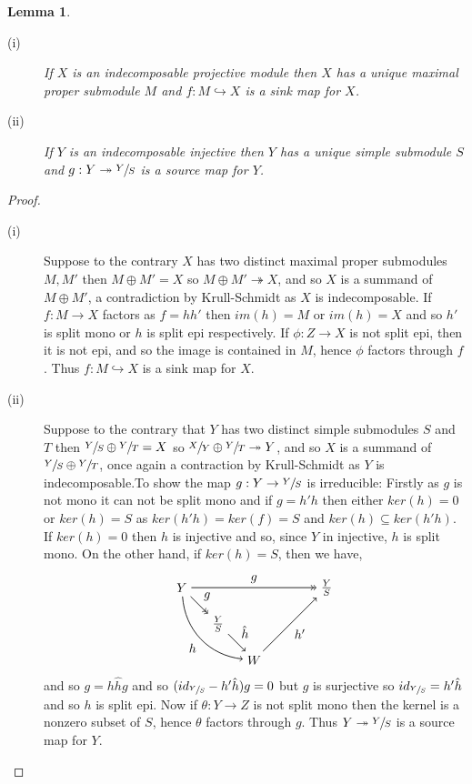 \documentclass[11.5pt, twoside, a4paper, titlepage]{report}
\theoremstyle{definition}
\theoremstyle{plain}
\newtheorem{lem}[mydef]{Lemma}
\begin{document}
\begin{lem} \label{sinksourcemapslem}
\begin{description}
\item [(i)] If $X$ is an indecomposable projective module then $X$ has a unique maximal proper submodule $M$ and $f:M \hookrightarrow X$ is a sink map for $X$.
\item [(ii)] If $Y$ is an indecomposable injective then $Y$ has a unique simple submodule $S$ and $g:Y \twoheadrightarrow \sfrac{Y}{S}$ is a source map for $Y$.
\end{description}
\end{lem}
\begin{proof}
\begin{description}
\item [(i)] Suppose to the contrary $X$ has two distinct maximal proper submodules $M, M'$ then $M \oplus M'=X$ so $M \oplus M' \twoheadrightarrow X$, and so $X$ is a summand of $M\oplus M'$, a contradiction by Krull-Schmidt as $X$ is indecomposable. If $f: M \to X$ factors as $f=hh'$ then $im(h)=M$ or $im(h)=X$ and so $h'$ is split mono or $h$ is split epi respectively. If $\phi: Z \to X$ is not split epi, then it is not epi, and so the image is contained in $M$, hence $\phi$ factors through $f$. Thus $f: M\hookrightarrow X$ is a sink map for $X$.
\item [(ii)] Suppose to the contrary that $Y$ has two distinct simple submodules $S$ and $T$ then $\sfrac{Y}{S} \oplus \sfrac{Y}{T} = X$ so $\sfrac{X}{Y} \oplus \sfrac{Y}{T} \twoheadrightarrow Y$, and so $X$ is a summand of $\sfrac{Y}{S} \oplus \sfrac{Y}{T}$, once again a contraction by Krull-Schmidt as $Y$ is indecomposable.To show the map $g: Y \to \sfrac{Y}{S}$ is irreducible: Firstly as $g$ is not mono it can not be split mono and if $g=h'h$ then either $ker(h)=0$  or $ker(h)=S$ as $ker(h'h)=ker(f)=S$ and $ker(h)\subseteq ker(h'h)$. If $ker(h)=0$ then $h$ is injective and so, since $Y$ in injective, $h$ is split mono. On the other hand, if $ker(h)=S$, then we have,
\begin{equation*}
\begin{tikzpicture}[->,-latex, auto, main path/.style={->, semithick}, main node/.style={}]
\node	[main node]		(1) at (0,0)		{$Y$};
\node [main node]		(2) at (4,0)		{$\frac{Y}{S}$};
\node [main node]		(3) at (1,-1)		{$\frac{Y}{S}$};
\node [main node]		(4) at (2,-2)		{$W$};

\draw (1) [->>, semithick] edge node [auto] {$g$} (2);
\draw (1) [->>, semithick] edge node [auto] {$g$} (3);
\draw (3) [main path] edge node [auto] {$\hat{h}$} (4);
\draw (4) [main path] edge node [auto, swap] {$h'$} (2);
\draw (1) [main path] edge [bend right=40] node [auto, swap] {$h$} (4);
\end{tikzpicture}
\end{equation*}
and so $g=h\hat{h}g$ and so $(id_{\sfrac{Y}{S}}-h'\hat{h})g=0$ but $g$ is surjective so $id_{\sfrac{Y}{S}}=h'\hat{h}$ and so $h$ is split epi. Now if $\theta: Y \to Z$ is not split mono then the kernel is a nonzero subset of $S$, hence $\theta$ factors through $g$. Thus $Y \twoheadrightarrow \sfrac{Y}{S}$ is a source map for $Y$.
\end{description}
\end{proof}
\end{document}
